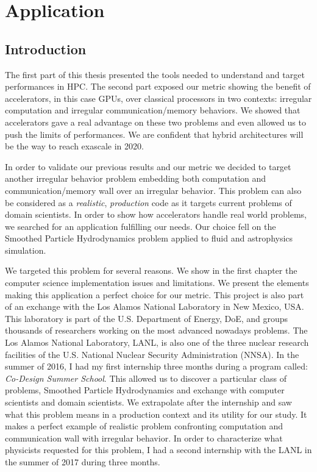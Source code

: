 \part{Application}

\chapter*{Introduction}
The first part of this thesis presented the tools needed to understand and target performances in HPC. 
The second part exposed our metric showing the benefit of accelerators, in this case GPUs, over classical processors in two contexts: irregular computation and irregular communication/memory behaviors.
We showed that accelerators gave a real advantage on these two problems and even allowed us to push the limits of performances.
We are confident that hybrid architectures will be the way to reach exascale in 2020.

In order to validate our previous results and our metric we decided to target another irregular behavior problem embedding both computation and communication/memory wall over an irregular behavior. 
This problem can also be considered as a \textit{realistic}, \textit{production} code as it targets current problems of domain scientists. 
In order to show how accelerators handle real world problems, we searched for an application fulfilling our needs. 
Our choice fell on the Smoothed Particle Hydrodynamics problem applied to fluid and astrophysics simulation. 

We targeted this problem for several reasons. 
We show in the first chapter the computer science implementation issues and limitations.
We present the elements making this application a perfect choice for our metric.
This project is also part of an exchange with the Los Alamos National Laboratory in New Mexico, USA. 
This laboratory is part of the U.S. Department of Energy, DoE, and groups thousands of researchers working on the most advanced nowadays problems.
The Los Alamos National Laboratory, LANL, is also one of the three nuclear research facilities of the U.S. National Nuclear Security Administration (NNSA). 
In the summer of 2016, I had my first internship three months during a program called: \textit{Co-Design Summer School}.
This allowed us to discover a particular class of problems, Smoothed Particle Hydrodynamics and exchange with computer scientists and domain scientists.
We extrapolate after the internship and saw what this problem means in a production context and its utility for our study. 
It makes a perfect example of realistic problem confronting computation and communication wall with irregular behavior. 
In order to characterize what physicists requested for this problem, I had a second internship with the LANL in the summer of 2017 during three months. 

